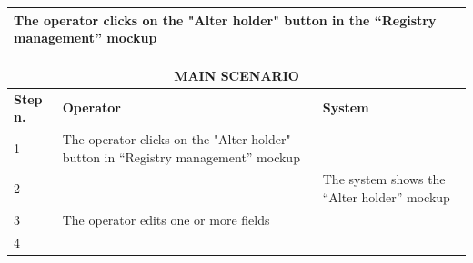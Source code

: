 {{{\begin{table}[h]
\begin{tabular}{|p{4cm}|p{10cm}|}
				\vspace{1mm} The operator clicks on the "Alter holder" button in the “Registry management” mockup \vspace{1mm}\\
			\hline
			\end{tabular}
			\end{table}
			\begin{table}[h]
			\begin{tabular}{|p{2cm}|p{6cm}|p{6cm}|}
			\hline
				\multicolumn{3}{|c|}{MAIN SCENARIO} \\
			\hline
				\centering \vspace{1mm} \bfseries{Step n.} \vspace{1mm} & \vspace{1mm} \bfseries{Operator} \vspace{1mm} & \vspace{1mm} \bfseries{System} \vspace{1mm}\\
			\hline
				\vspace{1mm} 1 \vspace{1mm} &
				\vspace{1mm} The operator clicks on the "Alter holder" button in “Registry management” mockup \vspace{1mm} & 
				\vspace{1mm} \vspace{1mm} \\
			\hline
				\vspace{1mm} 2 \vspace{1mm} &
				\vspace{1mm} \vspace{1mm} & 
				\vspace{1mm} The system shows the “Alter holder” mockup \vspace{1mm} \\
			\hline
				\vspace{1mm} 3 \vspace{1mm} &
				\vspace{1mm} The operator edits one or more fields \vspace{1mm} & 
				\vspace{1mm} \vspace{1mm} \\
			\hline
				\vspace{1mm} 4 \vspace{1mm} &
				\vspace{1mm} \vspace{1mm} & 

\end{tabular}
\end{table}}}}
